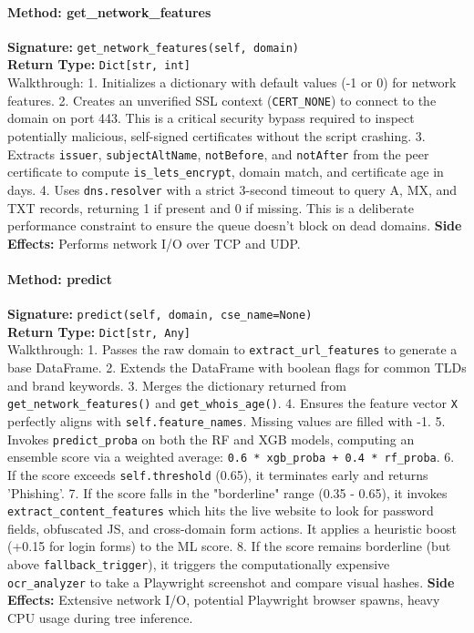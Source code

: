 \documentclass[12pt,a4paper]{report}
\begin{document}
\paragraph{Method: get\_network\_features}
\textbf{Signature:} \texttt{get\_network\_features(self, domain)} \\
\textbf{Return Type:} \texttt{Dict[str, int]} \\
Walkthrough:
1. Initializes a dictionary with default values (-1 or 0) for network features.
2. Creates an unverified SSL context (\texttt{CERT\_NONE}) to connect to the domain on port 443. This is a critical security bypass required to inspect potentially malicious, self-signed certificates without the script crashing.
3. Extracts \texttt{issuer}, \texttt{subjectAltName}, \texttt{notBefore}, and \texttt{notAfter} from the peer certificate to compute \texttt{is\_lets\_encrypt}, domain match, and certificate age in days.
4. Uses \texttt{dns.resolver} with a strict 3-second timeout to query A, MX, and TXT records, returning 1 if present and 0 if missing. This is a deliberate performance constraint to ensure the queue doesn't block on dead domains.
\textbf{Side Effects:} Performs network I/O over TCP and UDP. 

\paragraph{Method: predict}
\textbf{Signature:} \texttt{predict(self, domain, cse\_name=None)} \\
\textbf{Return Type:} \texttt{Dict[str, Any]} \\
Walkthrough:
1. Passes the raw domain to \texttt{extract\_url\_features} to generate a base DataFrame.
2. Extends the DataFrame with boolean flags for common TLDs and brand keywords.
3. Merges the dictionary returned from \texttt{get\_network\_features()} and \texttt{get\_whois\_age()}.
4. Ensures the feature vector \texttt{X} perfectly aligns with \texttt{self.feature\_names}. Missing values are filled with -1.
5. Invokes \texttt{predict\_proba} on both the RF and XGB models, computing an ensemble score via a weighted average: \texttt{0.6 * xgb\_proba + 0.4 * rf\_proba}.
6. If the score exceeds \texttt{self.threshold} (0.65), it terminates early and returns 'Phishing'.
7. If the score falls in the "borderline" range (0.35 - 0.65), it invokes \texttt{extract\_content\_features} which hits the live website to look for password fields, obfuscated JS, and cross-domain form actions. It applies a heuristic boost (+0.15 for login forms) to the ML score.
8. If the score remains borderline (but above \texttt{fallback\_trigger}), it triggers the computationally expensive \texttt{ocr\_analyzer} to take a Playwright screenshot and compare visual hashes.
\textbf{Side Effects:} Extensive network I/O, potential Playwright browser spawns, heavy CPU usage during tree inference.
\end{document}
